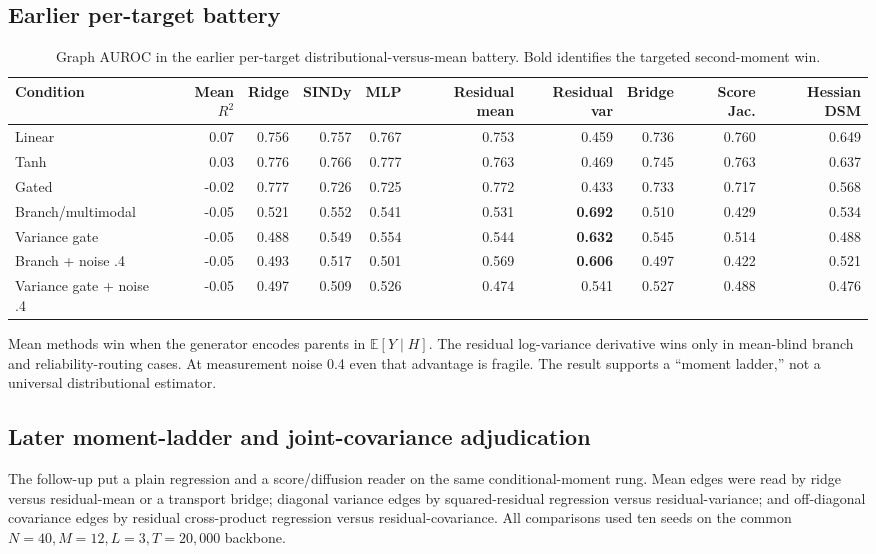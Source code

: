 \documentclass[10pt]{article}
\newcommand{\best}[1]{\ifmmode\boldsymbol{#1}\else\textbf{#1}\fi}
\newcommand{\E}{\mathbb{E}}
\begin{document}
\subsection{Earlier per-target battery}

\begin{table}[H]
\centering\footnotesize
\begin{tabularx}{\linewidth}{Y rrrrrrrrr}
\toprule
Condition & Mean $R^2$ & Ridge & SINDy & MLP & Residual mean & Residual var & Bridge & Score Jac. & Hessian DSM \\
\midrule
Linear & 0.07 & 0.756 & 0.757 & 0.767 & 0.753 & 0.459 & 0.736 & 0.760 & 0.649 \\
Tanh & 0.03 & 0.776 & 0.766 & 0.777 & 0.763 & 0.469 & 0.745 & 0.763 & 0.637 \\
Gated & -0.02 & 0.777 & 0.726 & 0.725 & 0.772 & 0.433 & 0.733 & 0.717 & 0.568 \\
Branch/multimodal & -0.05 & 0.521 & 0.552 & 0.541 & 0.531 & \best{0.692} & 0.510 & 0.429 & 0.534 \\
Variance gate & -0.05 & 0.488 & 0.549 & 0.554 & 0.544 & \best{0.632} & 0.545 & 0.514 & 0.488 \\
Branch + noise .4 & -0.05 & 0.493 & 0.517 & 0.501 & 0.569 & \best{0.606} & 0.497 & 0.422 & 0.521 \\
Variance gate + noise .4 & -0.05 & 0.497 & 0.509 & 0.526 & 0.474 & 0.541 & 0.527 & 0.488 & 0.476 \\
\bottomrule
\end{tabularx}
\caption{Graph AUROC in the earlier per-target distributional-versus-mean battery. Bold identifies the targeted second-moment win.}
\end{table}

Mean methods win when the generator encodes parents in $\E[Y\mid H]$. The residual log-variance derivative wins only in mean-blind branch and reliability-routing cases. At measurement noise 0.4 even that advantage is fragile. The result supports a ``moment ladder,'' not a universal distributional estimator.

\subsection{Later moment-ladder and joint-covariance adjudication}

The follow-up put a plain regression and a score/diffusion reader on the same conditional-moment rung. Mean edges were read by ridge versus residual-mean or a transport bridge; diagonal variance edges by squared-residual regression versus residual-variance; and off-diagonal covariance edges by residual cross-product regression versus residual-covariance. All comparisons used ten seeds on the common $N=40,M=12,L=3,T=20{,}000$ backbone.
\end{document}
